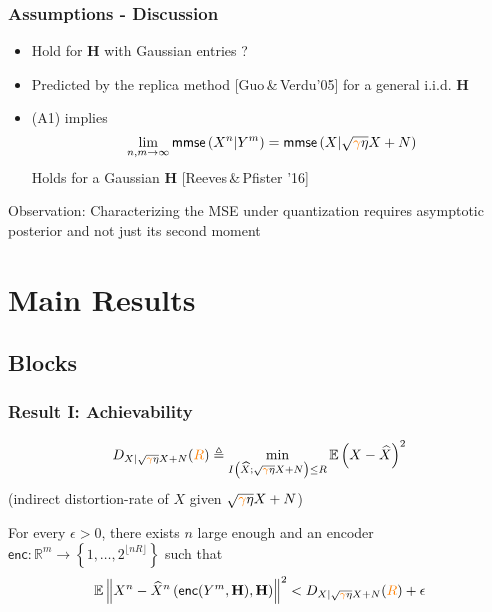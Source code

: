 \documentclass{beamer}
\newcommand{\Xc}{{\color{black} X}}
\newcommand{\Rc}{{\color{orange} R}}
\newcommand{\gammac}{{\color{orange} \gamma}}
\newcommand{\enc}{\mathsf{enc}}
\begin{document}
\begin{frame}
\frametitle{Assumptions - Discussion}
\begin{itemize}
\item {\color{red} Hold for $\mathbf H$ with Gaussian entries }?
\item Predicted by the replica method [Guo\,\&\,Verdu'05] for a general i.i.d. $\mathbf H$
\item (A1) implies
\[
\lim_{n,m\rightarrow \infty} \mathsf{mmse}\left(\Xc^n | {Y^m} \right) = \mathsf{mmse}\left(\Xc|\sqrt{\gammac \eta} \Xc+N \right)
\]
Holds for a Gaussian $\mathbf H$ [Reeves\,\&\,Pfister '16]
\end{itemize}
\begin{alertblock}{Observation:}
Characterizing the MSE under quantization requires asymptotic posterior and not just its second moment
\end{alertblock}
\end{frame}

\section{Main Results}
\subsection{Blocks}
\begin{frame}
\frametitle{Result I: Achievability}

\begin{definition}
\[
D_{\Xc|\sqrt{\gammac \eta} \Xc +N }(\Rc) \triangleq  \min_{I\left(\widehat{X} ; \sqrt{ \gammac \eta} \Xc+N \right) \leq R } \mathbb E \left(\Xc - \widehat{X} \right)^2
\]
(indirect distortion-rate of $X$ given $\sqrt{ \gammac \eta} \Xc+N$)
\end{definition}

\begin{theorem} 
For every $\epsilon>0$, there exists $n$ large enough and an encoder $\enc : \mathbb R^m \rightarrow \left\{1,\ldots,2^{\lfloor n R \rfloor} \right\}$ such that
\[
\mathbb E \left\| \Xc^n - \widehat{X}^n \left( \enc(Y^m,\mathbf H) ,\mathbf H \right) \right\|^2 < D_{X| \sqrt{ \gammac \eta}\Xc+N} (\Rc) +\epsilon
\]
\end{theorem}
\end{frame}
\end{document}
